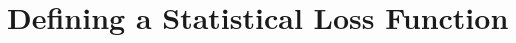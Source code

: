 \ifdefined\ispartofbook
\else
  
  
\fi

\section{Defining a Statistical Loss Function}
\label{sec:statistical_loss}


\ifdefined\ispartofbook
\else
  
\fi

